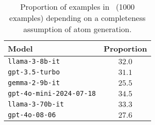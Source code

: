 \begin{table}[h!]
\centering
\small
\setlength\tabcolsep{2pt}
\begin{tabular}{l c} 
\toprule
\textbf{Model} & \textbf{Proportion} \\ 
\midrule
\texttt{llama-3-8b-it} & $32.0$ \\
\texttt{gpt-3.5-turbo} & $31.1$ \\
\texttt{gemma-2-9b-it} & $25.5$ \\
\texttt{gpt-4o-mini-2024-07-18} & $34.5$ \\
\texttt{llama-3-70b-it} & $33.3$ \\
\texttt{gpt-4o-08-06} & $27.6$ \\
\bottomrule
\end{tabular}
\caption{Proportion of examples in \snlitest~(1000 examples) depending on a completeness assumption of atom generation.}
\label{tab:proportion-completeness}
\end{table}